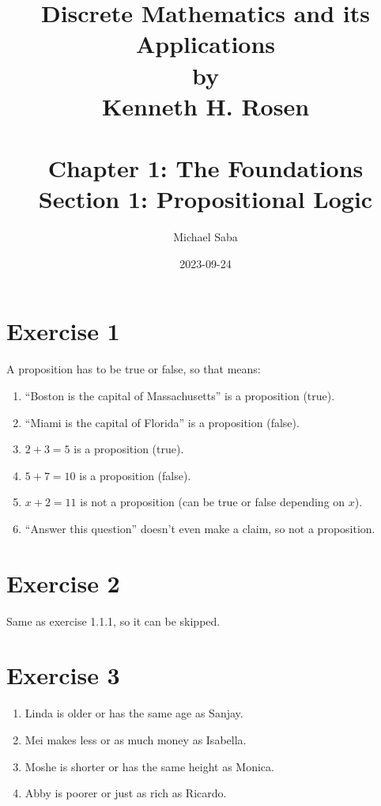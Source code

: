 \documentclass[12pt]{article}
\title{%
    \Huge Discrete Mathematics and its Applications \\
    \large by \\
    \Large Kenneth H. Rosen \\~\\
    \huge Chapter 1: The Foundations \\
    \LARGE Section 1: Propositional Logic \\
}
\date{2023-09-24}
\author{Michael Saba}
\begin{document}
    \maketitle
    \newpage


    \section*{Exercise 1}
    A proposition has to be true or false,
    so that means:
    \begin{enumerate}[label=\textbf{\alph*.}]
        \item
            \enquote{Boston is the capital of Massachusetts} 
            is a proposition (true).
        \item
            \enquote{Miami is the capital of Florida} 
            is a proposition (false).
        \item 
            $2 + 3 = 5$ is a proposition (true).
        \item 
            $5 + 7 = 10$ is a proposition (false).
        \item 
            $x + 2 = 11$ is not a proposition 
            (can be true or false depending on $x$).
        \item
            \enquote{Answer this question} 
            doesn't even make a claim,
            so not a proposition.
    \end{enumerate}


    \section*{Exercise 2}
    Same as exercise 1.1.1, so it can be skipped.


    \section*{Exercise 3}
    \begin{enumerate}[label=\textbf{\alph*.}]
        \item
            Linda is older or has the same age as Sanjay.
        \item
            Mei makes less or as much money as Isabella. 
        \item 
            Moshe is shorter or has the same height as Monica.
        \item 
            Abby is poorer or just as rich as Ricardo.
    \end{enumerate}
\end{document}
